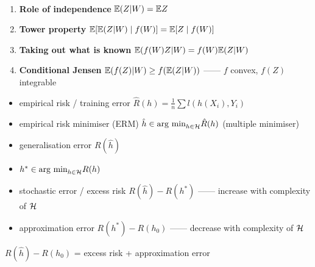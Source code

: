 \begin{prop}\,
    \begin{enumerate}
        \item \textbf{Role of independence} $\mathbb{E}(Z|W) = \mathbb{E} Z$
        \item \textbf{Tower property} $\mathbb{E}{[\mathbb{E}(Z|W)\mid f(W)]} = \mathbb{E} [Z\mid f(W)]$
        \item \textbf{Taking out what is known} $\mathbb{E}(f(W)Z|W) = f(W)\mathbb{E} (Z | W)$
        \item \textbf{Conditional Jensen} $\mathbb{E}(f(Z)|W) \geq f(\mathbb{E} (Z | W))$ ------ $f$ convex, $f(Z)$ integrable
    \end{enumerate}
\end{prop}

\begin{itemize}
    \item empirical risk / training error $\hat R(h) = \frac{1}{n} \sum l(h(X_i), Y_i)$
    \item empirical risk minimiser (ERM) $\hat h \in \textnormal{arg min}_{h \in \mathcal{H}} \hat R(h)$ (multiple minimiser)
    \item generalisation error $R(\hat h)$
    \item $h^* \in \textnormal{arg min}_{h \in \mathcal{H}} R(h)$
    \item stochastic error / excess risk $R(\hat h) - R(h^*)$ ------ increase with complexity of $\mathcal{H}$
    \item approximation error $R(h^*) - R(h_0)$ ------ decrease with complexity of $\mathcal{H}$
\end{itemize}

\begin{fact}
    $R(\hat h) - R(h_0)$ = excess risk + approximation error
\end{fact}


